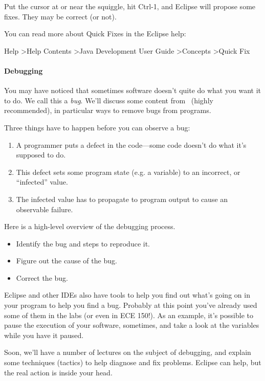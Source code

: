 Put the cursor at or near the squiggle, hit Ctrl-1, and Eclipse will
propose some fixes. They may be correct (or not).

You can read more about Quick Fixes in the Eclipse help:
\begin{center}
 Help \textgreater Help Contents \textgreater Java Development User Guide \textgreater Concepts \textgreater Quick Fix
\end{center}


\paragraph{Debugging} 

You may have noticed that sometimes software doesn't quite do what you
want it to do. We call this a \emph{bug}.  We'll discuss some content
from~\cite{zeller09:_why_progr_fail} (highly recommended), in particular
ways to remove bugs from programs.

Three things have to happen before you can observe a bug:\\[-2em]
\begin{enumerate} \setlength{\itemsep}{-.5em} 
\item A programmer puts a defect in the code---some code doesn't do
  what it's supposed to do.
\item This defect sets some program state (e.g. a variable) to an
  incorrect, or ``infected'' value.
\item The infected value has to propagate to program output to cause
an observable failure.
\end{enumerate}

Here is a high-level overview of the debugging process.\\[-2em]
\begin{itemize}
\item Identify the bug and steps to reproduce it.
\item Figure out the cause of the bug.
\item Correct the bug.
\end{itemize}

Eclipse and other IDEs also have tools to help you find out what's going on in your program to help you find a bug. Probably at this point you've already used some of them in the labs (or even in ECE 150!). As an example, it's possible to pause the execution of your software, sometimes, and take a look at the variables while you have it paused.

Soon, we'll have a number of lectures on the subject of debugging, and
explain some techniques (tactics) to help diagnose and fix
problems. Eclipse can help, but the real action is inside your head.







